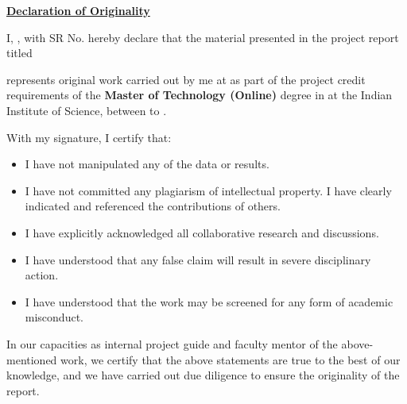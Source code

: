 \documentclass[oneside,12pt]{IIScthesisPSnPDF}
\newcommand{\blankpage}{
\newpage
\thispagestyle{empty}
\mbox{}
\newpage
}
\begin{document}
\blankpage
\thispagestyle{empty}


\begin{center}
\LARGE{\underline{\textbf{Declaration of Originality}}}
\end{center}
\noindent I, \textbf{\myauthor}, with SR No. \textbf{\mysrno} hereby declare that the material presented in the project report titled

\begin{center}
\textbf{\mytitle}
\end{center}

\noindent represents original work carried out by me at \textbf{\mycompanyname} as part of the project credit requirements of the \textbf{Master of Technology (Online)} degree in \textbf{\mystream} at the Indian Institute of Science, between \textbf{\mydegreejoindate} to \textbf{\mydegreeenddate}.

\noindent With my signature, I certify that:
\begin{itemize}
	\item I have not manipulated any of the data or results.
	\item I have not committed any plagiarism of intellectual property.	I have clearly indicated and referenced the contributions of others.
	\item I have explicitly acknowledged all collaborative research	and discussions.
	\item I have understood that any false claim will result in severe disciplinary action.
	\item I have understood that the work may be screened for any form of academic misconduct.
\end{itemize}

\vspace{10mm}

 \qquad

\vspace{10mm}

\noindent In our capacities as internal project guide and faculty mentor of the above-mentioned work, we certify that the above statements are true to the best of our knowledge, and we have carried out due diligence to ensure the originality of the report.

\vspace{10mm}
\end{document}

